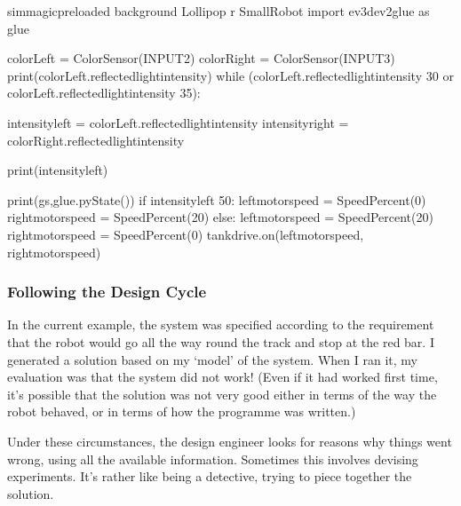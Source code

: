 \documentclass[letterpaper,10pt,english]{sphinxmanual}
\begin{document}
{{
\begin{sphinxVerbatim}[commandchars=\\\{\}]
\llap{\color{nbsphinxin}[ ]:\,\hspace{\fboxrule}\hspace{\fboxsep}}\PYGZpc{}\PYGZpc{}sim\PYGZus{}magic\PYGZus{}preloaded \PYGZhy{}\PYGZhy{}background Lollipop \PYGZhy{}r Small\PYGZus{}Robot
import ev3dev2\PYGZus{}glue as glue

colorLeft = ColorSensor(INPUT\PYGZus{}2)
colorRight = ColorSensor(INPUT\PYGZus{}3)
print(colorLeft.reflected\PYGZus{}light\PYGZus{}intensity)
while (colorLeft.reflected\PYGZus{}light\PYGZus{}intensity \PYGZlt{} 30 or colorLeft.reflected\PYGZus{}light\PYGZus{}intensity \PYGZgt{} 35):

    intensity\PYGZus{}left = colorLeft.reflected\PYGZus{}light\PYGZus{}intensity
    \PYGZsh{}intensity\PYGZus{}right = colorRight.reflected\PYGZus{}light\PYGZus{}intensity

    print(intensity\PYGZus{}left)

    print(\PYGZsq{}gs\PYGZsq{},glue.pyState())
    if intensity\PYGZus{}left \PYGZlt{} 50:
        left\PYGZus{}motor\PYGZus{}speed = SpeedPercent(0)
        right\PYGZus{}motor\PYGZus{}speed = SpeedPercent(20)
    else:
        left\PYGZus{}motor\PYGZus{}speed = SpeedPercent(20)
        right\PYGZus{}motor\PYGZus{}speed = SpeedPercent(0)
    tank\PYGZus{}drive.on(left\PYGZus{}motor\PYGZus{}speed, right\PYGZus{}motor\PYGZus{}speed)

\end{sphinxVerbatim}
}


\subsubsection{Following the Design Cycle}
\label{\detokenize{content/04_Robot_Lab/Section_00_04:Following-the-Design-Cycle}}
In the current example, the system was specified according to the requirement that the robot would go all the way round the track and stop at the red bar. I generated a solution based on my ‘model’ of the system. When I ran it, my evaluation was that the system did not work! (Even if it had worked first time, it’s possible that the solution was not very good either in terms of the way the robot behaved, or in terms of how the programme was written.)

Under these circumstances, the design engineer looks for reasons why things went wrong, using all the available information. Sometimes this involves devising experiments. It’s rather like being a detective, trying to piece together the solution.

}
\end{document}
